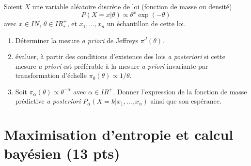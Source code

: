 \documentclass[10pt]{article}
\newcommand{\R}{I\!\!R}
\newcommand{\N}{I\!\!N}
\newcommand{\E}{\mbox{E}}
\newcommand{\V}{\mbox{Var}}
\newcommand{\1}{\mathbbm{1}}
\begin{document}
Soient $X$ une variable al\'eatoire discr\`ete  de loi (fonction de masse ou densit\'e)
$$
P(X=x|\theta) \propto \theta^x \exp(-\theta) 
$$
avec $x\in\N$,  $\theta\in\R^+_*$, et $x_1,\ldots,x_n$ un \'echantillon de cette loi.
\begin{enumerate}
\item D\'eterminer la mesure {\it a priori} de Jeffreys $\pi^J(\theta)$.
\item \'evaluer, \`a partir des conditions d'existence des lois {\it a posteriori} si cette mesure {\it a priori} est pr\'ef\'erable \`a la mesure {\it a priori} invariante par transformation d'\'echelle $\pi_0(\theta)\propto1/\theta$.
\item Soit $\pi_{\alpha}(\theta) \propto \theta^{-\alpha}$ avec $\alpha\in\R^+$. Donner l'expression de la fonction de masse pr\'edictive {\it a posteriori} $P_{\alpha}(X=k|x_1,\ldots,x_n)$ ainsi que son esp\'erance.  %
\end{enumerate}




\section{Maximisation d'entropie et calcul bay\'esien (13 pts) }\label{max.entropie}
\end{document}
